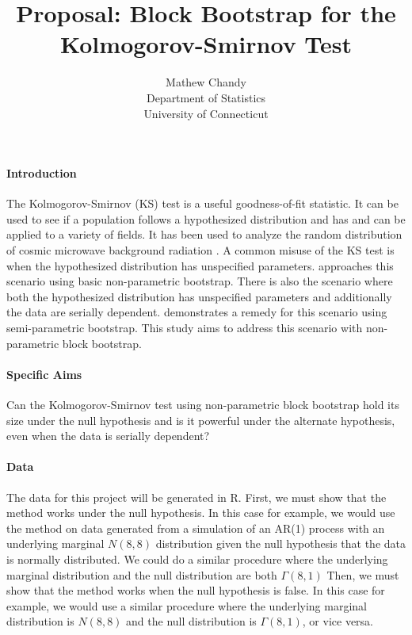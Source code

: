 \documentclass[12pt]{article}
\title{Proposal: Block Bootstrap for the Kolmogorov-Smirnov Test}
\author{Mathew Chandy\\
  Department of Statistics\\
  University of Connecticut
}
\begin{document}
\maketitle


\paragraph{Introduction}
The Kolmogorov-Smirnov (KS) test is a useful goodness-of-fit statistic. It 
can be used to see if a population follows a hypothesized distribution and has 
and can be applied to a variety of fields. It has
been used to analyze the random distribution of cosmic microwave background 
radiation \citep{naess2012application}. A common misuse of the KS test is when
the hypothesized distribution has unspecified parameters. 
\citet{babu2004goodness} approaches this scenario using basic 
non-parametric bootstrap. There is also the scenario where both the hypothesized 
distribution has unspecified parameters and additionally the data are 
serially dependent. \citet{zeimbekakis2022misuses} demonstrates a remedy for
this scenario using semi-parametric bootstrap. This study aims to address this
scenario with non-parametric block bootstrap.




\paragraph{Specific Aims}
Can the Kolmogorov-Smirnov test using non-parametric block bootstrap
hold its size under the null hypothesis and is it powerful under the alternate 
hypothesis, even when the data is serially dependent?



\paragraph{Data}
The data for this project will be generated in R. 
First, we must show that the method works under the null hypothesis. In this 
case for example, we would use the method on data generated from a simulation
of an AR(1) process with an underlying marginal $N(8,8)$ distribution given the 
null hypothesis that the data is normally distributed. We could do a similar 
procedure where the underlying marginal distribution and
the null distribution are both $\Gamma(8,1)$
Then, we must show that the method works when the null hypothesis is false.
In this case for example, we would use a similar procedure where the underlying
marginal distribution is $N(8,8)$ and the null distribution is $\Gamma(8,1)$,
or vice versa.
\end{document}

